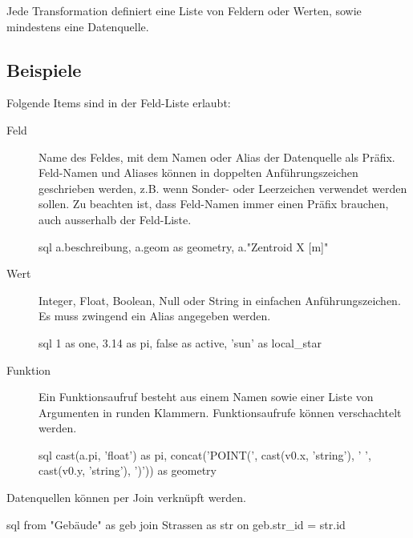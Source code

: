 Jede Transformation definiert eine Liste von Feldern oder Werten, sowie mindestens eine Datenquelle. 

\subsection{Beispiele}
Folgende Items sind in der Feld-Liste erlaubt:
\begin{description}
\item[Feld] Name des Feldes, mit dem Namen oder Alias der Datenquelle als Präfix. Feld-Namen und Aliases können in doppelten Anführungszeichen geschrieben werden, z.B. wenn Sonder- oder Leerzeichen verwendet werden sollen. Zu beachten ist, dass Feld-Namen immer einen Präfix brauchen, auch ausserhalb der Feld-Liste.
\begin{src}{sql}
a.beschreibung, a.geom as geometry, a."Zentroid X [m]"
\end{src}
\item[Wert] Integer, Float, Boolean, Null oder String in einfachen Anführungszeichen. Es muss zwingend ein Alias angegeben werden. 
\begin{src}{sql}
1 as one, 3.14 as pi, false as active, 'sun' as local_star
\end{src}
\item[Funktion] Ein Funktionsaufruf besteht aus einem Namen sowie einer Liste von Argumenten in runden Klammern. Funktionsaufrufe können verschachtelt werden.
\begin{src}{sql}
 cast(a.pi, 'float') as pi,
 concat('POINT(', cast(v0.x, 'string'), ' ', cast(v0.y, 'string'), ')')) as geometry
\end{src}
\end{description}

Datenquellen können per Join verknüpft werden.
\begin{src}{sql}
  from "Gebäude" as geb join Strassen as str on geb.str_id = str.id
\end{src}

